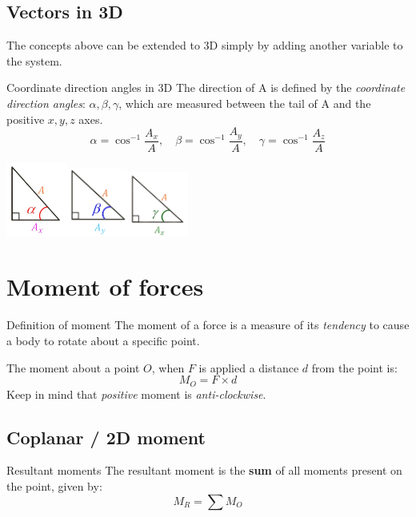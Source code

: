 \documentclass{article}
\begin{document}
\subsection{Vectors in 3D}
The concepts above can be extended to 3D simply by adding another variable to the system.
\begin{knBox}
    {Coordinate direction angles in 3D}
    The direction of A is defined by the \emph{coordinate direction angles}: $\alpha, \beta, \gamma$, which are measured between the tail of A and the positive $x, y, z$ axes.
    \[\alpha=\cos^{-1}\frac{A_x}{A},\quad\beta=\cos^{-1}\frac{A_y}{A},\quad\gamma=\cos^{-1}\frac{A_z}{A}\]
    \begin{center}
        \includegraphics[width=2cm]{img/Ax.png}\includegraphics[width=2cm]{img/Ay.png}\includegraphics[width=2cm]{img/Az.png}
    \end{center}
\end{knBox}

\section{Moment of forces}
\begin{definition}
    {Definition of moment}
    The moment of a force is a measure of its \emph{tendency} to cause a body to rotate about a specific point.

    The moment about a point $O$, when $F$ is applied a distance $d$ from the point is:
    \[M_O=F\times d\]
    Keep in mind that \emph{positive} moment is \emph{anti-clockwise}.
\end{definition}
\subsection{Coplanar / 2D moment}
\begin{knBox}
    {Resultant moments}
    The resultant moment is the \textbf{sum} of all moments present on the point, given by:
    \[M_R=\sum M_O\]
\end{knBox}
\end{document}
